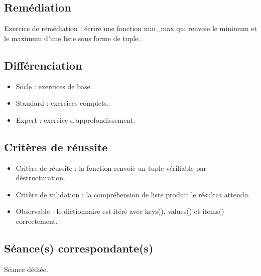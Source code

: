 \subsection{Remédiation}

Exercice de remédiation : écrire une fonction min\_max qui renvoie le
minimum et le maximum d'une liste sous forme de tuple.

\subsection{Différenciation}

\begin{itemize}
\tightlist
\item
  Socle : exercices de base.
\item
  Standard : exercices complets.
\item
  Expert : exercice d'approfondissement.
\end{itemize}

\subsection{Critères de réussite}

\begin{itemize}
\tightlist
\item
  Critère de réussite : la fonction renvoie un tuple vérifiable par
  déstructuration.
\item
  Critère de validation : la compréhension de liste produit le résultat
  attendu.
\item
  Observable : le dictionnaire est itéré avec keys(), values() et
  items() correctement.
\end{itemize}

\subsection{Séance(s) correspondante(s)}

Séance dédiée.
